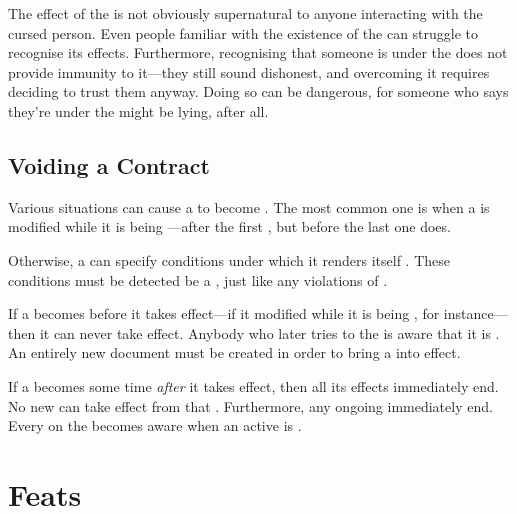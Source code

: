 The effect of the {\liarscurse} is not obviously supernatural to anyone interacting with the cursed person.
Even people familiar with the existence of the {\liarscurse} can struggle to recognise its effects.
Furthermore, recognising that someone is under the {\liarscurse} does not provide immunity to it---they still sound dishonest, and overcoming it requires deciding to trust them anyway.
Doing so can be dangerous, for someone who says they're under the {\liarscurse} might be lying, after all.

\subsection{Voiding a Contract}

Various situations can cause a {\contract} to become {\void}.
The most common one is when a {\contract} is modified while it is being {\signed}---after the first {\signatory} {\signs}, but before the last one does.

Otherwise, a {\contract} can specify conditions under which it renders itself {\void}.
These conditions must be detected be a {\signatory}, just like any violations of {\stipulations}.

If a {\contract} becomes {\void} before it takes effect---if it modified while it is being {\signed}, for instance---then it can never take effect.
Anybody who later tries to {\sign} the {\contract} is aware that it is {\void}.
An entirely new document must be created in order to bring a {\contract} into effect.

If a {\contract} becomes {\void} some time \emph{after} it takes effect, then all its effects immediately end.
No new {\penalties} can take effect from that {\contract}.
Furthermore, any ongoing {\penalties} immediately end.
Every {\signatory} on the {\contract} becomes aware when an active {\contract} is {\voided}.

\section{Feats}



